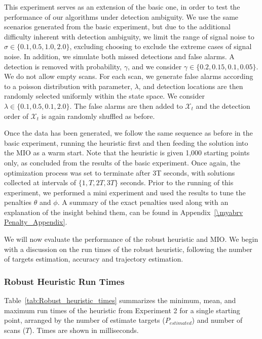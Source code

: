 This experiment serves as an extension of the basic one, in order to test the performance of our algorithms under detection ambiguity. We use the same scenarios generated from the basic experiment, but due to the additional difficulty inherent with detection ambiguity, we limit the range of signal noise to $\sigma \in \{0.1,0.5,1.0,2.0\}$, excluding choosing to exclude the extreme cases of signal noise. In addition, we simulate both missed detections and false alarms. A detection is removed with probability, $\gamma$, and we consider $\gamma \in \{0.2,0.15,0.1,0.05\}$. We do not allow empty scans. For each scan, we generate false alarms according to a poisson distribution with parameter, $\lambda$, and detection locations are then randomly selected uniformly within the state space. We consider $\lambda \in \{0.1,0.5,0.1,2.0\}$. The false alarms are then added to $\mathcal{X}_{t}$ and the detection order of $\mathcal{X}_{t}$ is again randomly shuffled as before. 

Once the data has been generated, we follow the same sequence as before in the basic experiment, running the heuristic first and then feeding the solution into the MIO as a warm start. Note that the heuristic is given 1,000 starting points only, as concluded from the results of the basic experiment. Once again, the optimization process was set to terminate after 3T seconds, with solutions collected at intervals of $\{1,T,2T,3T\}$ seconds. Prior to the running of this experiment, we performed a mini experiment and used the results to tune the penalties $\theta$ and $\phi$. A summary of the exact penalties used along with an explanation of the insight behind them, can be found in Appendix~\ref{\myabrv Penalty_Appendix}. 

We will now evaluate the performance of the robust heuristic and MIO. We begin with a discussion on the run times of the robust heuristic, following the number of targets estimation, accuracy and trajectory estimation.

\subsubsection{Robust Heuristic Run Times} Table~\ref{tab:Robust_heuristic_times} summarizes the minimum, mean, and maximum run times of the heuristic from Experiment 2 for a single starting point, arranged by the number of estimate targets ($P_{estimated}$) and number of scans ($T$). Times are shown in milliseconds. 

